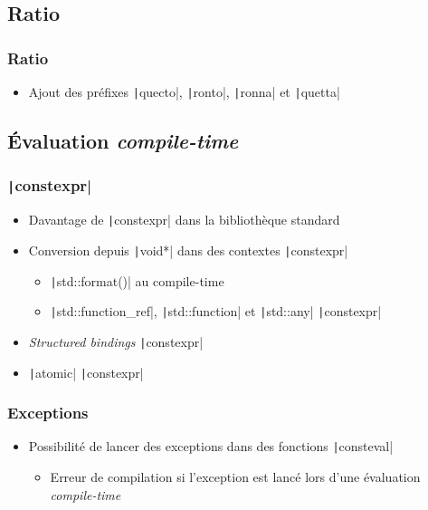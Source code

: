 \documentclass[C++.tex]{subfiles}
\begin{document}
\subsection*{Ratio}
\begin{frame}[fragile]
	\frametitle{Ratio}
	\begin{itemize}
		\item Ajout des préfixes \texttt|quecto|, \texttt|ronto|, \texttt|ronna| et \texttt|quetta|
	\end{itemize}

\end{frame}

\subsection*{Évaluation \textit{compile-time}}
\begin{frame}[fragile]
	\frametitle{\texttt|constexpr|}
	\begin{itemize}
		\item Davantage de \texttt|constexpr| dans la bibliothèque standard
		\item Conversion depuis \texttt|void*| dans des contextes \texttt|constexpr|
		\begin{itemize}
			\item \texttt|std::format()| au compile-time
			\item \texttt|std::function_ref|, \texttt|std::function| et \texttt|std::any| \texttt|constexpr|
		\end{itemize}
		\item \textit{Structured bindings} \texttt|constexpr|
		\item \texttt|atomic| \texttt|constexpr|
	\end{itemize}

\end{frame}

\begin{frame}[fragile]
	\frametitle{Exceptions}
	\begin{itemize}
		\item Possibilité de lancer des exceptions dans des fonctions \texttt|consteval|
		\begin{itemize}
			\item Erreur de compilation si l'exception est lancé lors d'une évaluation \textit{compile-time}
		\end{itemize}
	\end{itemize}

\end{frame}
\end{document}
